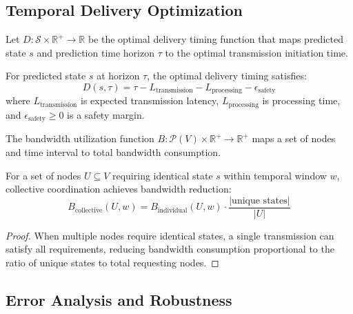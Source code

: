 \subsection{Temporal Delivery Optimization}

\begin{definition}
Let $D: \mathcal{S} \times \mathbb{R}^+ \to \mathbb{R}$ be the optimal delivery timing function that maps predicted state $s$ and prediction time horizon $\tau$ to the optimal transmission initiation time.
\end{definition}

\begin{proposition}
For predicted state $s$ at horizon $\tau$, the optimal delivery timing satisfies:
\begin{equation}
D(s, \tau) = \tau - L_{\text{transmission}} - L_{\text{processing}} - \epsilon_{\text{safety}}
\end{equation}
where $L_{\text{transmission}}$ is expected transmission latency, $L_{\text{processing}}$ is processing time, and $\epsilon_{\text{safety}} \geq 0$ is a safety margin.
\end{proposition}

\begin{definition}
The bandwidth utilization function $B: \mathcal{P}(V) \times \mathbb{R}^+ \to \mathbb{R}^+$ maps a set of nodes and time interval to total bandwidth consumption.
\end{definition}

\begin{theorem}
For a set of nodes $U \subseteq V$ requiring identical state $s$ within temporal window $w$, collective coordination achieves bandwidth reduction:
\begin{equation}
B_{\text{collective}}(U, w) = B_{\text{individual}}(U, w) \cdot \frac{|\text{unique states}|}{|U|}
\end{equation}
\end{theorem}

\begin{proof}
When multiple nodes require identical states, a single transmission can satisfy all requirements, reducing bandwidth consumption proportional to the ratio of unique states to total requesting nodes.
\end{proof}

\subsection{Error Analysis and Robustness}

